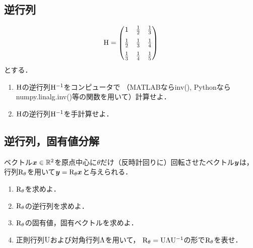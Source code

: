 \subsection{逆行列}
    \begin{equation}
      \mathrm{H} =
        \begin{pmatrix}
                     1 & \frac{1}{2} & \frac{1}{3} \\[1.5ex]
           \frac{1}{2} & \frac{1}{3} & \frac{1}{4} \\[1.5ex]
           \frac{1}{3} & \frac{1}{4} & \frac{1}{5}
        \end{pmatrix}
    \end{equation}
    とする．
    \begin{enumerate}[label=(\roman*)]
      \item $\mathrm{H}$の逆行列$\mathrm{H}^{-1}$をコンピュータで
        （MATLABならinv(), Pythonならnumpy.linalg.inv()等の関数を用いて）計算せよ．
        
      \item $\mathrm{H}$の逆行列$\mathrm{H}^{-1}$を手計算せよ．
    \end{enumerate}

\subsection{逆行列，固有値分解}
  ベクトル$\boldsymbol{x} \in \mathbb{R}^2$を原点中心に$\theta$だけ（反時計回りに）回転させたベクトル$\boldsymbol{y}$は，
  行列$\mathrm{R}_\theta$を用いて$\boldsymbol{y} = \mathrm{R}_\theta \boldsymbol{x}$と与えられる．
  \begin{enumerate}[label=(\roman*)]
    \item $\mathrm{R}_\theta$を求めよ．
    \item $\mathrm{R}_\theta$の逆行列を求めよ．
    \item $\mathrm{R}_\theta$の固有値，固有ベクトルを求めよ．
    \item 正則行列$\mathrm{U}$および対角行列$\mathrm{\Lambda}$を用いて，
      $\mathrm{R}_\theta = \mathrm{U}\mathrm{\Lambda} \mathrm{U}^{-1}$の形で$\mathrm{R}_\theta$を表せ．
  \end{enumerate}

